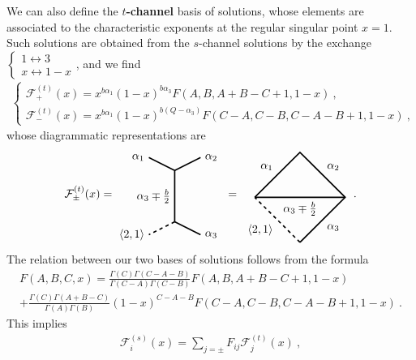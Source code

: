 \documentclass[12pt,a4paper,notitlepage]{report}
\numberwithin{equation}{section}
\theoremstyle{break}
\begin{document}
We can also define the \textbf{\boldmath $t$-channel} basis of solutions, whose elements are associated to the characteristic exponents at the regular singular point $x=1$.
Such solutions are obtained from the $s$-channel solutions by the exchange $\left\{\begin{smallmatrix} 1\leftrightarrow 3\\ x\leftrightarrow 1-x \end{smallmatrix}\right.$, and we find 
\begin{align}
 \left\{\begin{array}{l}  \mathcal{F}^{(t)}_+(x) = x^{b\alpha_1} (1-x)^{b\alpha_3} F(A,B,A+B-C+1,1-x) \ ,
\\ \mathcal{F}^{(t)}_-(x) =x^{b\alpha_1} (1-x)^{b(Q-\alpha_3)} F(C-A,C-B,C-A-B+1,1-x)\ ,
\end{array}\right.  
\end{align}
whose diagrammatic representations are 
\begin{align}
 \mathcal{F}^{(t)}_\pm(x)  =  
 \begin{tikzpicture}[baseline=(current  bounding  box.center), very thick, scale = .4]
 \draw (-2,3) node [left] {$\alpha_1$} -- (0,2) -- node [left] {$\alpha_3\mp \frac{b}{2}$} (0,-2);
 \draw[dashed] (0, -2) -- (-2, -3) node [left] {$\langle 2,1 \rangle$};
\draw (0,2) -- (2,3) node [right] {$\alpha_2$};
\draw (0,-2) -- (2, -3) node [right] {$\alpha_3$};
\end{tikzpicture}
\ =\
\begin{tikzpicture}[baseline=(current  bounding  box.center), very thick, scale = .7]
\draw (-2, 0) -- node [above left] {$\alpha_1$} (0, 2) -- node [above right] {$\alpha_2$} (2, 0) -- node [below right] {$\alpha_3$} (0, -2);
\draw[dashed] (0, -2) -- node [below left] {$\langle 2,1 \rangle$} (-2, 0);
\draw (-2, 0) -- node [below] {$\alpha_3\mp \frac{b}{2}$} (2, 0); 
\end{tikzpicture}
\ \ .
\label{tpic}
\end{align}
The relation between our two bases of solutions follows from the formula
\begin{multline}
 F(A,B,C,x) = \frac{\Gamma(C)\Gamma(C-A-B)}{\Gamma(C-A)\Gamma(C-B)} F(A,B,A+B-C+1,1-x) 
\\
 + \frac{\Gamma(C)\Gamma(A+B-C)}{\Gamma(A)\Gamma(B)} (1-x)^{C-A-B}F(C-A,C-B,C-A-B+1,1-x)\ .
\end{multline}
This implies 
\begin{align}
 \mathcal{F}^{(s)}_i(x) = \sum_{j=\pm} F_{ij} \mathcal{F}^{(t)}_j(x)\ ,
\label{gfg}
\end{align}
\end{document}
